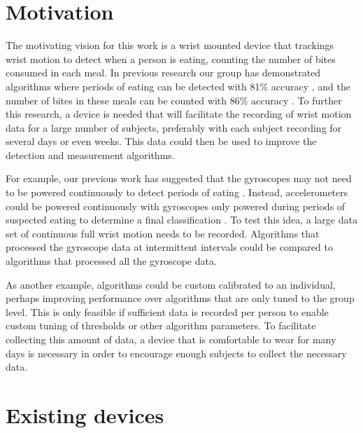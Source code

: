 \section{Motivation}
\label{Sec:Motivation}

The motivating vision for this work is a wrist mounted device that trackings wrist motion to detect when a person is eating,
counting the number of bites consumed in each meal.
In previous research our group has demonstrated algorithms where periods of eating can be detected with 81\% accuracy \cite{Dong2014},
and the number of bites in these meals can be counted with 86\% accuracy \cite{Dong2012}.
To further this research,
a device is needed that will facilitate the recording of wrist motion data for a large number of subjects, preferably with each subject recording for several days or even weeks.  This data could then be used to improve the detection and measurement algorithms.

For example, our previous work has suggested that the gyroscopes may not need to be powered continuously to detect periods of eating \cite{Dong2014}.  Instead, accelerometers could be powered continuously with gyroscopes only powered during periods of suspected eating to determine a final classification \cite{Dong2014}.  To test this idea, a large data set of continuous full wrist motion needs to be recorded.  Algorithms that processed the gyroscope data at intermittent intervals could be compared to algorithms that processed all the gyroscope data.

As another example, algorithms could be custom calibrated to an individual, perhaps improving performance over algorithms that are only tuned to the group level.  This is only feasible if sufficient data is recorded per person to enable custom tuning of thresholds or other algorithm parameters.  To facilitate collecting this amount of data, a device that is comfortable to wear for many days is necessary in order to encourage enough subjects to collect the necessary data.
 

\section{Existing devices}
\label{Sec:FitnessTracking}

